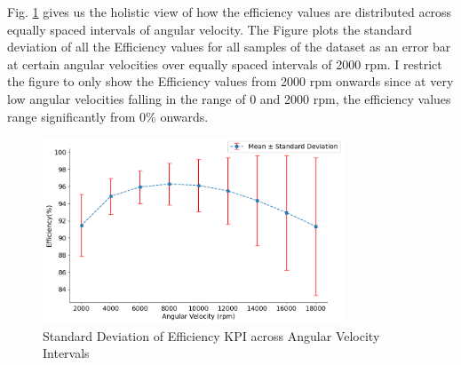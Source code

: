 \documentclass{report} %
\begin{document}
Fig. \ref{fig:Standard Deviation of Efficiency KPI across Angular Velocity Intervals} gives us the holistic view of how the efficiency values are 
distributed across equally spaced intervals of angular velocity. The Figure plots the standard deviation of all the Efficiency values for all samples of the dataset 
as an error bar at certain angular velocities over equally spaced intervals of 2000 rpm.
I restrict the figure to only show the Efficiency values from 2000 rpm onwards since at very low angular velocities falling in the range of 0 and 2000 rpm, the efficiency 
values range significantly from 0\% onwards.

\begin{figure}[H]
    \centering
    \includegraphics[width=0.8\textwidth]{./ReportImages/stddev_y2_nn_Target.png} 
    \caption{Standard Deviation of Efficiency \ac{KPI} across Angular Velocity Intervals} 
    \label{fig:Standard Deviation of Efficiency KPI across Angular Velocity Intervals}
\end{figure}
\end{document}

